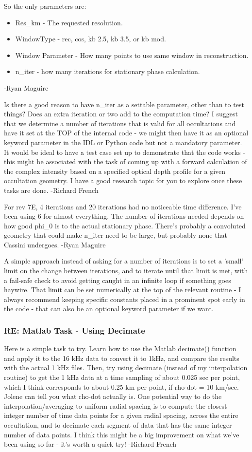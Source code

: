 \documentclass[crop=false,class=article,oneside]{standalone}
\begin{document}
So the only parameters are:
\begin{itemize}
    \item Res\_km - The requested resolution.
    \item WindowType - rec, cos, kb 2.5, kb 3.5, or kb mod.
    \item Window Parameter - How many points to use same window in reconstruction.
    \item n\_iter - how many iterations for stationary phase calculation.
\end{itemize}
-Ryan Maguire\par
Is there a good reason to have n\_iter as a settable parameter, other than to test things? Does an extra iteration or two add to the computation time? I suggest that we determine a number of iterations that is valid for all occultations and have it set at the TOP of the internal code - we might then have it as an optional keyword parameter in the IDL or Python code but not a mandatory parameter. It would be ideal to have a test case set up to demonstrate that the code works - this might be associated with the task of coming up with a forward calculation of the complex intensity based on a specified optical depth profile for a given occultation geometry. I have a good research topic for you to explore once these tasks are done. -Richard French\par
For rev 7E, 4 iterations and 20 iterations had no noticeable time difference. I've been using 6 for almost everything. The number of iterations needed depends on how good phi\_0 is to the actual stationary phase. There's probably a convoluted geometry that could make n\_iter need to be large, but probably none that Cassini undergoes. -Ryan Maguire\par
A simple approach instead of asking for a number of iterations is to set a 'small' limit on the change between iterations, and to iterate until that limit is met, with a fail-safe check to avoid getting caught in an infinite loop if something goes haywire. That limit can be set numerically at the top of the relevant routine - I always recommend keeping specific constants placed in a prominent spot early in the code - that can also be an optional keyword parameter if we want.
\subsubsection{\footnotesize RE: Matlab Task - Using Decimate}
Here is a simple task to try. Learn how to use the Matlab decimate() function and apply it to the 16 kHz data to convert it to 1kHz, and compare the results with the actual 1 kHz files. Then, try using decimate (instead of my interpolation routine) to get the 1 kHz data at a time sampling of about 0.025 sec per point, which I think corresponds to about 0.25 km per point, if rho-dot = 10 km/sec. Jolene can tell you what rho-dot actually is. One potential way to do the interpolation/averaging to uniform radial spacing is to compute the closest integer number of time data points for a given radial spacing, across the entire occultation, and to decimate each segment of data that has the same integer number of data points. I think this might be a big improvement on what we've been using so far - it's worth a quick try! -Richard French
\end{document}
